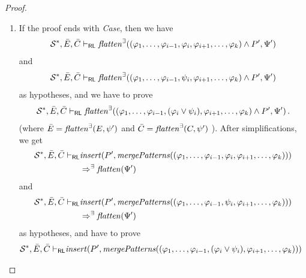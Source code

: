 \documentclass{article}
\newcommand{\RL}{\mathsf{RL}}
\begin{document}
\begin{proof}
\begin{enumerate}
    \item If the proof ends with \emph{Case}, then we have
        \begin{equation*}
            \mathcal{S}^*, \Bar{E}, \Bar{C} \vdash_\RL
            \mathit{flatten}^\exists((\varphi_1, \ldots, \varphi_{i-1}, \varphi_i, \varphi_{i+1}, \ldots, \varphi_k) \land P^\prime, \Psi^\prime)
        \end{equation*}
        and
        \begin{equation*}
            \mathcal{S}^*, \Bar{E}, \Bar{C} \vdash_\RL
            \mathit{flatten}^\exists((\varphi_1, \ldots, \varphi_{i-1}, \psi_i, \varphi_{i+1}, \ldots, \varphi_k) \land P^\prime, \Psi^\prime) 
        \end{equation*}
        as hypotheses, and we have to prove
        \begin{equation*}
            \mathcal{S}^*, \Bar{E}, \Bar{C} \vdash_\RL
            \mathit{flatten}^\exists((\varphi_1, \ldots, \varphi_{i-1}, (\varphi_i \lor \psi_i), \varphi_{i+1}, \ldots, \varphi_k) \land P^\prime, \Psi^\prime)               \, .
        \end{equation*}
        (where $\Bar{E} = \mathit{flatten}^\exists(E, \psi^\prime)$
         and $\Bar{C} = \mathit{flatten}^\exists(C, \psi^\prime)$
        ).
        After simplifications, we get
        \begin{align*}
            \mathcal{S}^*, \Bar{E}, \Bar{C} \vdash_\RL
            &
            \mathit{insert}(P^\prime, \mathit{mergePatterns}((\varphi_1, \ldots, \varphi_{i-1}, \varphi_i, \varphi_{i+1}, \ldots, \varphi_k)))
            \\ & \Rightarrow^\exists
            \mathit{flatten}(\Psi^\prime)
        \end{align*}
        and
        \begin{align*}
            \mathcal{S}^*, \Bar{E}, \Bar{C} \vdash_\RL
            &
            \mathit{insert}(P^\prime, \mathit{mergePatterns}((\varphi_1, \ldots, \varphi_{i-1}, \psi_i, \varphi_{i+1}, \ldots, \varphi_k)))
            \\ & \Rightarrow^\exists
            \mathit{flatten}(\Psi^\prime)
        \end{align*}
        as hypotheses,
        and have to prove
        \begin{align*}
            \mathcal{S}^*, \Bar{E}, \Bar{C} \vdash_\RL
            &
            \mathit{insert}(P^\prime, \mathit{mergePatterns}((\varphi_1, \ldots, \varphi_{i-1}, (\varphi_i \lor \psi_i), \varphi_{i+1}, \ldots, \varphi_k)))

\end{align*}
\end{enumerate}
\end{proof}
\end{document}
